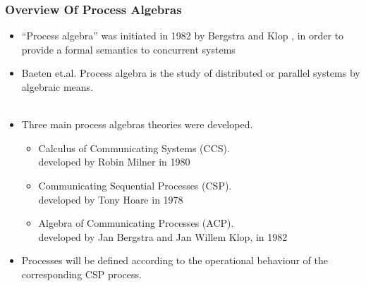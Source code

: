 \documentclass{beamer}
\begin{document}
\begin{frame}
\frametitle{Overview Of Process Algebras } %

\begin{itemize}
\item ``Process algebra'' was initiated in 1982 by Bergstra and Klop \cite{begstraKlop:FixedPointSemantics}, in order to provide a formal semantics to concurrent systems

\end{itemize}

\begin{itemize}
\item Baeten et.al.
 Process algebra is the study of distributed or parallel systems by algebraic means. \\~\\

\end{itemize}



\begin{itemize}
\item Three main process algebras theories were developed.

\begin{itemize}

\item Calculus of Communicating Systems (CCS). \\
{\footnotesize developed by Robin Milner in 1980}

\item Communicating Sequential Processes (CSP). \\
{\footnotesize developed by Tony Hoare in 1978  }

\item Algebra of Communicating Processes (ACP). \\
{\footnotesize developed by Jan Bergstra and Jan Willem Klop, in 1982 }

\end{itemize}


\item Processes will be defined according to the operational behaviour of the corresponding CSP process.

\end{itemize}
\end{frame}
\end{document}
